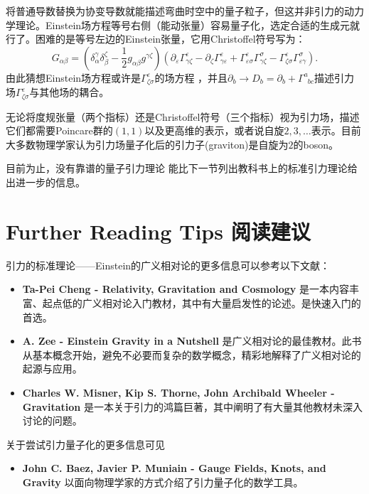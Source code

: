 将普通导数替换为协变导数就能描述弯曲时空中的量子粒子，但这并非引力的动力学理论。Einstein场方程等号右侧（能动张量）容易量子化，选定合适的生成元就行了。困难的是等号左边的Einstein张量，它用Christoffel符号写为：
\begin{equation}
\label{equ12.15}
    G_{\alpha \beta} = (\delta^\gamma_\alpha \delta^\zeta_\beta - \frac{1}{2} g_{\alpha \beta} g^{\gamma \zeta}) (\partial_\varepsilon \Gamma^\varepsilon_{\gamma \zeta} - \partial_\zeta \Gamma^\varepsilon_{\gamma \varepsilon} + \Gamma^\varepsilon_{\varepsilon \sigma} \Gamma^\sigma_{\gamma \zeta} - \Gamma^\varepsilon_{\zeta \sigma} \Gamma^\sigma_{\varepsilon \gamma}).
\end{equation}
由此猜想Einstein场方程或许是$\Gamma^\varepsilon_{\zeta \sigma}$的场方程%
%
，并且$\partial_b \to D_b = \partial_b + \Gamma^a_{\phantom{a} bc}$描述引力场$\Gamma^\varepsilon_{\zeta \sigma}$与其他场的耦合。

无论将度规张量（两个指标）还是Christoffel符号（三个指标）视为引力场，描述它们都需要Poincare群的$(1, 1)$以及更高维的表示，或者说自旋$2, 3, \dots$表示。目前大多数物理学家认为引力场量子化后的引力子(graviton)是自旋为$2$的boson。

目前为止，没有靠谱的量子引力理论%
%
能比下一节列出教科书上的标准引力理论给出进一步的信息。

\section*{Further Reading Tips \quad 阅读建议}
引力的标准理论——Einstein的广义相对论的更多信息可以参考以下文献：
\begin{itemize}
    \item {\bf  Ta-Pei Cheng - Relativity, Gravitation and Cosmology}%
    是一本内容丰富、起点低的广义相对论入门教材，其中有大量启发性的论述。是快速入门的首选。
    \item {\bf  A. Zee - Einstein Gravity in a Nutshell}%
    是广义相对论的最佳教材。此书从基本概念开始，避免不必要而复杂的数学概念，精彩地解释了广义相对论的起源与应用。
    \item {\bf  Charles W. Misner, Kip S. Thorne, John Archibald Wheeler - Gravitation}%
    是一本关于引力的鸿篇巨著，其中阐明了有大量其他教材未深入讨论的问题。
\end{itemize}
关于尝试引力量子化的更多信息可见
\begin{itemize}
    \item {\bf John C. Baez, Javier P. Muniain - Gauge Fields, Knots, and Gravity}%
    以面向物理学家的方式介绍了引力量子化的数学工具。
\end{itemize}
